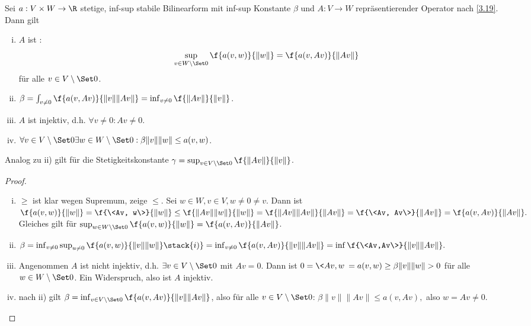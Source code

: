 \begin{st} \label{3.32}
	Sei $a: V \times W \to \R$ stetige, inf-sup stabile Bilinearform mit inf-sup Konstante $\beta$ und $A: V \to W$ repräsentierender Operator nach \ref{3.19}.
	Dann gilt
	\begin{enumerate}[i)]
		\item
			$A$ ist :
			\[
				\sup_{v \in W\setminus \Set 0} \f{a(v,w)}{\|w\|}
				= \f{a(v,Av)}{\|Av\|}
			\]
			für alle $v \in V \setminus \Set 0$.
		\item
			$\beta = \int_{v \neq 0} \f {a(v,Av)}{\|v\| \|Av\|} = \inf_{v \neq 0} \f{\|Av\|}{\|v\|}$.
		\item
			$A$ ist injektiv, d.h. $\forall v \neq 0 : Av \neq 0$.
		\item
			$\forall v \in V \setminus \Set 0 \exists w \in W \setminus \Set 0 : \beta \|v\|\|w\| \le a(v,w)$.
	\end{enumerate}
	\begin{note}
		Analog zu ii) gilt für die Stetigkeitskonstante $\gamma = \sup_{v \in V \setminus \Set 0} \f{\|Av\|}{\|v\|}$.
	\end{note}
	\begin{proof}
		\begin{enumerate}[i)]
			\item
				$\ge$ ist klar wegen Supremum, zeige $\le$.
				Sei $w \in W, v \in V, w \neq 0 \neq v$.
				Dann ist
				\begin{math}
					\f {a(v,w)}{\|w\|}
					= \f{\<Av, w\>}{\|w\|}
					\le \f{\|Av\|\|w\|}{\|w\|}
					= \f{\|Av\|\|Av\|}{\|Av\|}
					= \f{\<Av, Av\>}{\|Av\|}
					= \f{a(v,Av)}{\|Av\|}.
				\end{math}
				Gleiches gilt für $\sup_{w\in W\setminus \Set 0} \f{a(v,w)}{\|w\|} = \f {a(v,Av)}{\|Av\|}$.
			\item
				\begin{math}
					\beta
					= \inf_{v\neq 0} \sup_{u\neq 0} \f{a(v,w)}{\|v\|\|w\|}
					\stack{i)}= \inf_{v\neq 0} \f{a(v,Av)}{\|v\|\|Av\|}
					= \inf \f{\<Av,Av\>}{\|v\|\|Av\|}.
				\end{math}
			\item
				Angenommen $A$ ist nicht injektiv, d.h. $\exists v \in V \setminus \Set 0$ mit $Av = 0$.
				Dann ist
				\begin{math}
					0
					= \<Av, w\>
					= a(v,w)
					\ge \beta \|v\|\|w\|
					> 0
				\end{math}
				für alle $w \in W \setminus \Set 0$.
				Ein Widerspruch, also ist $A$ injektiv.
			\item
				nach ii) gilt $\beta = \inf_{v\in V \setminus \Set 0} \f{a(v,Av)}{\|v\|\|Av\|}$, also für alle $v \in V \setminus \Set 0$:
				\begin{math}
					\beta \|v\|\|Av\| \le a(v,Av),
				\end{math}
				also $w = Av \neq 0$.
		\end{enumerate}
	\end{proof}
\end{st}

